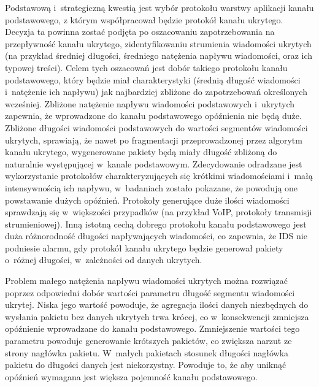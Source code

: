 \documentclass[a4paper, twoside, openright, 12pt]{report}
\begin{document}
       Podstawową i~strategiczną kwestią jest wybór protokołu warstwy aplikacji kanału podstawowego,
       z którym współpracował będzie protokół kanału ukrytego. Decyzja ta powinna zostać
       podjęta po oszacowaniu zapotrzebowania na przepływność kanału ukrytego,
       zidentyfikowaniu strumienia wiadomości ukrytych (na przykład średniej długości,
       średniego natężenia napływu wiadomości, oraz ich typowej treści).
       Celem tych oszacowań jest dobór takiego protokołu
       kanału podstawowego, który będzie miał charakterystyki (średnią długość wiadomości
       i~natężenie ich napływu) jak najbardziej zbliżone do zapotrzebowań określonych
       wcześniej. Zbliżone natężenie napływu wiadomości podstawowych i~ukrytych zapewnia,
       że wprowadzone do kanału podstawowego opóźnienia nie będą duże.
       Zbliżone długości wiadomości podstawowych do wartości segmentów wiadomości ukrytych,
       sprawiają, że nawet po fragmentacji przeprowadzonej przez algorytm kanału ukrytego,
       wygenerowane pakiety będą miały długość zbliżoną do naturalnie występującej
       w~kanale podstawowym. Zdecydowanie odradzane jest wykorzystanie protokołów
       charakteryzujących się krótkimi wiadomościami i~małą intensywnością ich napływu,
       w~badaniach zostało pokazane, że powodują one powstawanie dużych opóźnień.
       Protokoły generujące duże ilości wiadomości sprawdzają się w~większości
       przypadków (na przykład VoIP, protokoły transmisji strumieniowej).
       Inną istotną cechą dobrego protokołu kanału podstawowego jest duża różnorodność
       długości napływających wiadomości, co zapewnia, że IDS nie podniesie alarmu,
       gdy protokół kanału ukrytego będzie generował pakiety o~różnej długości,
       w~zależności od danych ukrytych.

       Problem małego natężenia napływu wiadomości ukrytych można rozwiązać poprzez
       odpowiedni dobór wartości parametru długość segmentu wiadomości ukrytej.
       Niska jego wartość powoduje, że agregacja ilości danych niezbędnych do
       wysłania pakietu bez danych ukrytych trwa krócej, co w~konsekwencji zmniejsza
       opóźnienie wprowadzane do kanału podstawowego. Zmniejszenie wartości tego parametru powoduje generowanie
       krótszych pakietów, co zwiększa narzut ze strony nagłówka pakietu. W~małych
       pakietach stosunek długości nagłówka pakietu do długości danych jest niekorzystny.
       Powoduje to, że aby uniknąć opóźnień wymagana jest większa pojemność kanału
       podstawowego.
\end{document}
